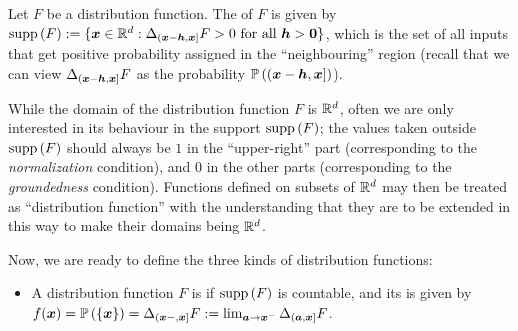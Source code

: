 \begin{enumerate}
Let \(F\) be a distribution function. The  of \(F\) is given by
\(\operatorname{supp}\left(F\right):= \{\bm{x}\in\mathbb{R}^d:\Delta_{(\bm{x}-\bm{h},\bm{x}]}F>0\text{
for all }\bm{h}>\bm{0}\}\), which is the set of all inputs that get
positive probability assigned in the ``neighbouring'' region (recall that we
can view \(\Delta_{(\bm{x}-\bm{h},\bm{x}]}F\) as the probability
\(\mathbb{P}\left((\bm{x}-\bm{h},\bm{x}]\right)\)).

While the domain of the distribution function \(F\) is \(\mathbb{R}^d\), often we are
only interested in its behaviour in the support \(\operatorname{supp}\left(F\right)\); the values taken
outside \(\operatorname{supp}\left(F\right)\) should always be \(1\) in the ``upper-right'' part
(corresponding to the \emph{normalization} condition), and \(0\) in the other
parts (corresponding to the \emph{groundedness} condition). Functions defined
on subsets of \(\mathbb{R}^d\) may then be treated as ``distribution function'' with
the understanding that they are to be extended in this way to make their
domains being \(\mathbb{R}^d\).

Now, we are ready to define the three kinds of distribution functions:
\begin{itemize}
\item A distribution function \(F\) is  if \(\operatorname{supp}\left(F\right)\) is
countable, and its  is given by
\(f(\bm{x})=\mathbb{P}\left(\{\bm{x}\}\right)
=\Delta_{(\bm{x}-,\bm{x}]}F
:=\lim_{\bm{a}\to \bm{x}^{-}}\Delta_{(\bm{a},\bm{x}]}F\).


\end{itemize}
\end{enumerate}
